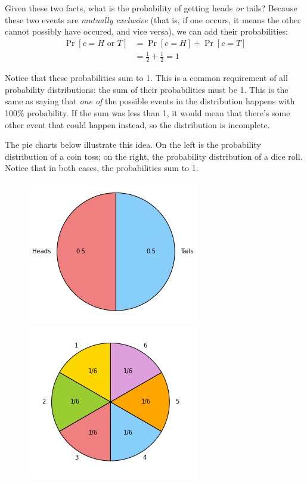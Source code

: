 Given these two facts, what is the probability of getting heads \emph{or}
tails? Because these two events are \emph{mutually exclusive} (that is, 
if one occurs, it means the other cannot possibly have occured, and 
vice versa), we can add their probabilities:
\begin{align*}
    \Pr[c = H \text{ or } T] &= \Pr[c=H] + \Pr[c=T] \\
    &= \frac{1}{2} + \frac{1}{2} = 1
\end{align*}

Notice that these probabilities sum to 1. 
This is a common requirement of all probability distributions: the sum of their 
probabilities must be 1. This is the same as saying that \emph{one of} the possible events 
in the distribution happens with 100\% probability. If the sum was less than 1, it 
would mean that there's some other event that could happen instead, so the distribution
is incomplete. %

The pie charts below illustrate this idea. On the left is the probability 
distribution of a coin toss; on the right, the probability distribution 
of a dice roll. Notice that in both cases, the probabilities sum to 1.

\begin{figure}[h]
    \includegraphics[width=.5\linewidth]{imgs/coin-pie.png}
    \includegraphics[width=.5\linewidth]{imgs/die-pie.png}
    \label{fig:pies}
  \end{figure}

